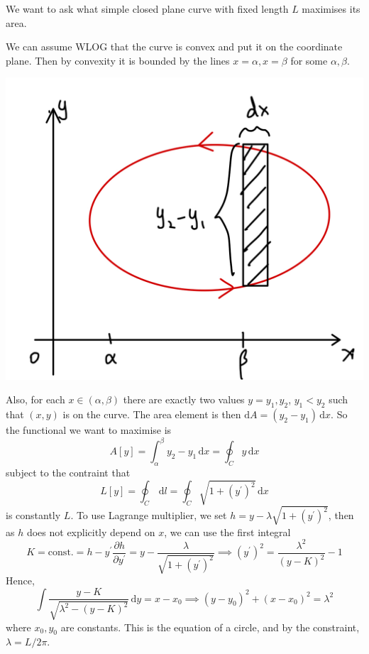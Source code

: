 \documentclass[a4paper]{article}
\begin{document}
\begin{example}
    We want to ask what simple closed plane curve with fixed length $L$ maximises its area.

    We can assume WLOG that the curve is convex and put it on the coordinate plane.
    Then by convexity it is bounded by the lines $x=\alpha,x=\beta$ for some $\alpha,\beta$.

    \begin{center}
        \includegraphics[scale=0.12]{isoparam.jpeg}
    \end{center}

    Also, for each $x\in(\alpha,\beta)$ there are exactly two values $y=y_1,y_2$, $y_1<y_2$ such that $(x,y)$ is on the curve.
    The area element is then $\mathrm dA=(y_2-y_1)\,\mathrm dx$.
    So the functional we want to maximise is
    $$A[y]=\int_\alpha^\beta y_2-y_1\,\mathrm dx=\oint_Cy\,\mathrm dx$$
    subject to the contraint that
    $$L[y]=\oint_C\,\mathrm dl=\oint_C\sqrt{1+(y^\prime)^2}\,\mathrm dx$$
    is constantly $L$.
    To use Lagrange multiplier, we set $h=y-\lambda\sqrt{1+(y^\prime)^2}$, then as $h$ does not explicitly depend on $x$, we can use the first integral
    $$K=\text{const.}=h-y^\prime\frac{\partial h}{\partial y^\prime}=y-\frac{\lambda}{\sqrt{1+(y^\prime)^2}}\implies (y^\prime)^2=\frac{\lambda^2}{(y-K)^2}-1$$
    Hence,
    $$\int\frac{y-K}{\sqrt{\lambda^2-(y-K)^2}}\,\mathrm dy=x-x_0\implies (y-y_0)^2+(x-x_0)^2=\lambda^2$$
    where $x_0,y_0$ are constants.
    This is the equation of a circle, and by the constraint, $\lambda=L/2\pi$.
\end{example}
\end{document}

